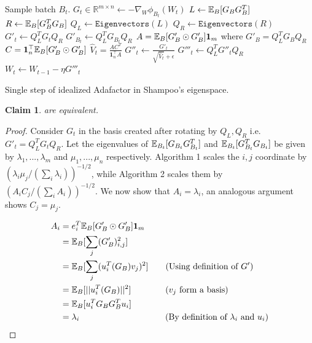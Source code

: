 \documentclass{article} %
\newtheorem{claim}{Claim}
\begin{document}
\begin{algorithm}[H]
	
	\begin{algorithmic}[1]
		\STATE Sample batch $B_t$.
		\STATE $G_{t} \in \mathbb{R}^{m \times n} \gets -\nabla_W \phi_{B_t}(W_t)$
		\STATE $L \gets \mathbb{E}_{B}[G_{B}G_{B}^T]$
		\STATE $R \gets \mathbb{E}_{B}[G_{B}^TG_{B}]$
		\STATE $Q_L \gets \texttt{Eigenvectors}(L)$
		\STATE $Q_R \gets \texttt{Eigenvectors}(R)$
		\STATE $G'_{t} \gets Q_L^T G_{t} Q_R$
		\STATE {}
		\STATE $G'_{B_t} \gets Q_L^T G_{B_t} Q_R$
		\STATE $A = \mathbb{E}_{B}[G'_{B} \odot G'_{B}] \mathbf{1}_m$ where $G'_{B} = Q_L^T G_{B} Q_R$
		\STATE $C = \mathbf{1}_n^\top \mathbb{E}_{B}[G'_{B} \odot G'_{B}]$
		\STATE $\hat{V}_t = \frac{A C^T}{\mathbf{1}_n^\top A}$ 
		\STATE $G''_{t} \gets \frac{G'_t}{\sqrt{\hat{V}_t} + \epsilon}$ 
		\STATE $G'''_{t} \gets Q_L^T G''_{t} Q_R$ 
		\STATE $W_t \gets W_{t-1} - \eta G'''_{t}$
	\end{algorithmic}
	\caption{Single step of idealized Adafactor in Shampoo's eigenspace.}
	\label{alg:shampoo_adafactor}
\end{algorithm}

\begin{claim}
	\label{claim:eq}
	 are equivalent. 
\end{claim}
\begin{proof}
	
	Consider $G_t$ in the basis created after rotating by $Q_L, Q_R$ i.e. $G'_t = Q_L^T G_t Q_R$. Let the eigenvalues of $\mathbb{E}_{B_t}[G_{B_t}G_{B_t}^T]$ and $\mathbb{E}_{B_t}[G_{B_t}^TG_{B_t}]$  be given by $\lambda_1,...,\lambda_m$ and $\mu_1,...,\mu_n$ respectively. Algorithm 1 scales the $i, j$ coordinate by $(\lambda_i \mu_j / (\sum_i \lambda_i))^{-1/2}$, while Algorithm 2 scales them by  $(A_i C_j / (\sum_i A_i))^{-1/2}$. We  now show that $A_i = \lambda_i$, an analogous argument shows $C_j = \mu_j$.
	
	\begin{align*}
		A_i &= e_i^T \mathbb{E}_{B}[G'_{B} \odot G'_{B}] \mathbf{1}_m \\
		&= \mathbb{E}_{B}[ \sum_j (G'_{B})_{i, j}^2] \\
		&= \mathbb{E}_{B}[ \sum_j (u_i^T(G_{B})v_j)^2] \quad \quad (\text{Using definition of } G') \\
		&= \mathbb{E}_{B}[  ||u_i^T(G_{B})||^2] \quad \quad \quad \quad (v_j \text{ form a basis})\\
		&= \mathbb{E}_{B}[ u_i^TG_{B}G_{B}^Tu_i] \\
		&= \lambda_i \quad \quad \quad \quad \quad \quad \quad \quad \quad \quad (\text{By definition of } \lambda_i \text{ and } u_i)
	\end{align*}
	
\end{proof}
\end{document}
